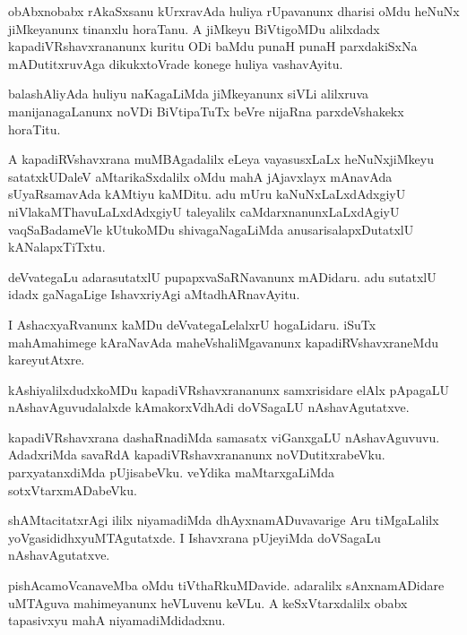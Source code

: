 \documentclass{article}
\begin{document}
\begin{mn}
obAbxnobabx rAkaSxsanu kUrxravAda huliya rUpavanunx dharisi oMdu heNuNx jiMkeyanunx tinanxlu 
horaTanu. A jiMkeyu BiVtigoMDu alilxdadx kapadiVRshavxrananunx kuritu ODi baMdu punaH punaH 
parxdakiSxNa mADutitxruvAga dikukxtoVrade konege huliya vashavAyitu.
\end{mn}

\begin{mn}
balashAliyAda huliyu naKagaLiMda jiMkeyanunx siVLi alilxruva manijanagaLanunx noVDi BiVtipaTuTx 
beVre nijaRna parxdeVshakekx horaTitu.
\end{mn}

\begin{mn}
A kapadiRVshavxrana muMBAgadalilx eLeya vayasusxLaLx heNuNxjiMkeyu satatxkUDaleV aMtarikaSxdalilx 
oMdu mahA jAjavxlayx mAnavAda sUyaRsamavAda kAMtiyu kaMDitu. adu mUru kaNuNxLaLxdAdxgiyU 
niVlakaMThavuLaLxdAdxgiyU taleyalilx caMdarxnanunxLaLxdAgiyU vaqSaBadameVle kUtukoMDu 
shivagaNagaLiMda anusarisalapxDutatxlU kANalapxTiTxtu.
\end{mn}

\begin{mn}
deVvategaLu adarasutatxlU pupapxvaSaRNavanunx mADidaru. adu sutatxlU idadx gaNagaLige 
IshavxriyAgi aMtadhARnavAyitu.
\end{mn}

\begin{mn}
I AshacxyaRvanunx kaMDu deVvategaLelalxrU hogaLidaru. iSuTx mahAmahimege kAraNavAda 
maheVshaliMgavanunx kapadiRVshavxraneMdu kareyutAtxre.
\end{mn}

\begin{mn}
kAshiyalilxdudxkoMDu kapadiVRshavxrananunx samxrisidare elAlx pApagaLU nAshavAguvudalalxde 
kAmakorxVdhAdi doVSagaLU nAshavAgutatxve.
\end{mn}

\begin{mn}
kapadiVRshavxrana dashaRnadiMda samasatx viGanxgaLU nAshavAguvuvu. AdadxriMda savaRdA 
kapadiVRshavxrananunx noVDutitxrabeVku. parxyatanxdiMda pUjisabeVku. veYdika maMtarxgaLiMda 
sotxVtarxmADabeVku.
\end{mn}

\begin{mn}
shAMtacitatxrAgi ililx niyamadiMda dhAyxnamADuvavarige Aru tiMgaLalilx yoVgasididhxyuMTAgutatxde. 
I Ishavxrana pUjeyiMda doVSagaLu nAshavAgutatxve.
\end{mn}

\begin{mn}
pishAcamoVcanaveMba oMdu tiVthaRkuMDavide. adaralilx sAnxnamADidare uMTAguva mahimeyanunx 
heVLuvenu keVLu. A keSxVtarxdalilx obabx tapasivxyu mahA niyamadiMdidadxnu.
\end{mn}
\end{document}
